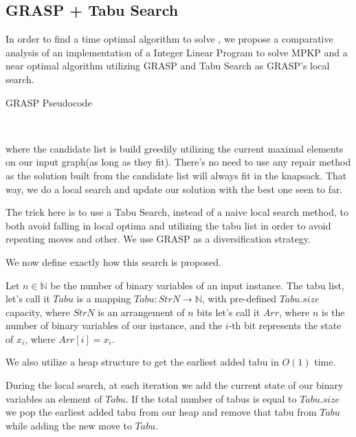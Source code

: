 \subsection{GRASP + Tabu Search}

In order to find a time optimal algorithm to solve \MUPKP, we propose a comparative analysis of an implementation of a Integer Linear Program to solve MPKP and a near optimal algorithm utilizing GRASP and Tabu Search as GRASP's local search.

\begin{algorithm}[ht!]
    \caption{GRASP Pseudocode}
    \begin{algorithmic}[1]
            \EndIf
        \EndFor
        \\
    \end{algorithmic}
\end{algorithm}
where the candidate list is build greedily utilizing the current maximal elements on our input graph(as long as they fit).
There's no need to use any repair method as the solution built from the candidate list will always fit in the knapsack.
That way, we do a local search and update our solution with the best one seen to far.

The trick here is to use a Tabu Search, instead of a naive local search method, to both avoid falling in local optima and utilizing the tabu list in order to avoid repeating moves and other. We use GRASP as a diversification strategy.

We now define exactly how this search is proposed.

Let $n \in \mathbb N$ be the number of binary variables of an input instance. The tabu list, let's call it $Tabu$ is a mapping $Tabu : StrN \rightarrow \mathbb N$, with pre-defined $Tabu.size$ capacity, where $StrN$ is an arrangement of $n$ bits let's call it $Arr$, where $n$ is the number of binary variables of our instance, and the $i$-th bit represents the state of $x_i$, where $Arr[i] = x_i$.

We also utilize a heap structure to get the earliest added tabu in $O(1)$ time.

During the local search, at each iteration we add the current state of our binary variables an element of $Tabu$. If the total number of tabus is equal to $Tabu.size$ we pop the earliest added tabu from our heap and remove that tabu from $Tabu$ while adding the new move to $Tabu$.

